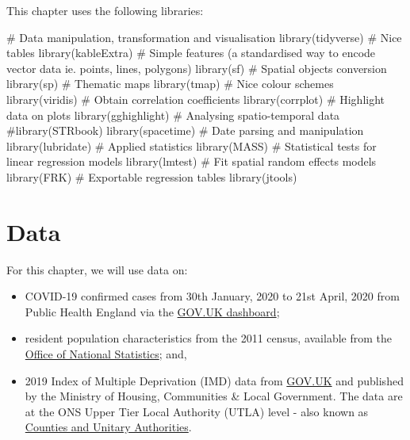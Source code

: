 \documentclass[
  letterpaper,
  DIV=11,
  numbers=noendperiod,
  oneside]{scrreprt}
\newenvironment{Shaded}{\begin{snugshade}}{\end{snugshade}}
\newcommand{\CommentTok}[1]{\textcolor[rgb]{0.37,0.37,0.37}{#1}}
\newcommand{\FunctionTok}[1]{\textcolor[rgb]{0.28,0.35,0.67}{#1}}
\newcommand{\NormalTok}[1]{\textcolor[rgb]{0.00,0.23,0.31}{#1}}
\begin{document}
This chapter uses the following libraries:

\begin{Shaded}
\begin{Highlighting}[]
\CommentTok{\# Data manipulation, transformation and visualisation}
\FunctionTok{library}\NormalTok{(tidyverse)}
\CommentTok{\# Nice tables}
\FunctionTok{library}\NormalTok{(kableExtra)}
\CommentTok{\# Simple features (a standardised way to encode vector data ie. points, lines, polygons)}
\FunctionTok{library}\NormalTok{(sf) }
\CommentTok{\# Spatial objects conversion}
\FunctionTok{library}\NormalTok{(sp) }
\CommentTok{\# Thematic maps}
\FunctionTok{library}\NormalTok{(tmap) }
\CommentTok{\# Nice colour schemes}
\FunctionTok{library}\NormalTok{(viridis) }
\CommentTok{\# Obtain correlation coefficients}
\FunctionTok{library}\NormalTok{(corrplot)}
\CommentTok{\# Highlight data on plots}
\FunctionTok{library}\NormalTok{(gghighlight)}
\CommentTok{\# Analysing spatio{-}temporal data}
\CommentTok{\#library(STRbook)}
\FunctionTok{library}\NormalTok{(spacetime)}
\CommentTok{\# Date parsing and manipulation}
\FunctionTok{library}\NormalTok{(lubridate)}
\CommentTok{\# Applied statistics}
\FunctionTok{library}\NormalTok{(MASS)}
\CommentTok{\# Statistical tests for linear regression models}
\FunctionTok{library}\NormalTok{(lmtest)}
\CommentTok{\# Fit spatial random effects models}
\FunctionTok{library}\NormalTok{(FRK)}
\CommentTok{\# Exportable regression tables}
\FunctionTok{library}\NormalTok{(jtools)}
\end{Highlighting}
\end{Shaded}

\section{Data}\label{data-6}

For this chapter, we will use data on:

\begin{itemize}
\item
  COVID-19 confirmed cases from 30th January, 2020 to 21st April, 2020
  from Public Health England via the
  \href{https://coronavirus.data.gov.uk}{GOV.UK dashboard};
\item
  resident population characteristics from the 2011 census, available
  from the \href{https://www.nomisweb.co.uk/home/census2001.asp}{Office
  of National Statistics}; and,
\item
  2019 Index of Multiple Deprivation (IMD) data from
  \href{https://www.gov.uk/government/statistics/english-indices-of-deprivation-2019}{GOV.UK}
  and published by the Ministry of Housing, Communities \& Local
  Government. The data are at the ONS Upper Tier Local Authority (UTLA)
  level - also known as
  \href{https://geoportal.statistics.gov.uk}{Counties and Unitary
  Authorities}.
\end{itemize}
\end{document}
